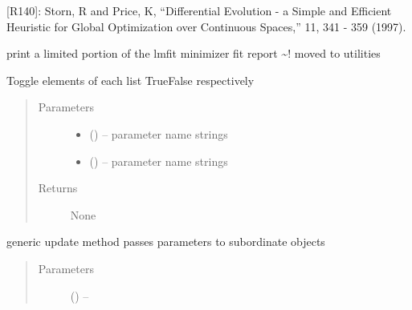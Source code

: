 \documentclass[letterpaper,10pt,english]{sphinxmanual}
\begin{document}
\begin{fulllineitems}
\begin{fulllineitems}
{[}R140{]}: Storn, R and Price, K, ``Differential Evolution - a Simple and Efficient Heuristic for Global                     Optimization over Continuous Spaces,''  11, 341 - 359 (1997).

\end{fulllineitems}


\begin{fulllineitems}
\label{\detokenize{rst/refinement:mstack.refinement.Refinement.filter_report}}
print a limited portion of the lmfit minimizer fit report
\textasciitilde{}! moved to utilities

\end{fulllineitems}


\begin{fulllineitems}
\label{\detokenize{rst/refinement:mstack.refinement.Refinement.flag}}
Toggle elements of each list True\textbar{}False respectively
\begin{quote}\begin{description}
\item[{Parameters}] \leavevmode\begin{itemize}
\item {} 
 () -- parameter name strings

\item {} 
 () -- parameter name strings

\end{itemize}

\item[{Returns}] \leavevmode
None

\end{description}\end{quote}

\end{fulllineitems}


\begin{fulllineitems}
\label{\detokenize{rst/refinement:mstack.refinement.Refinement.generic_update}}
generic update method passes parameters to subordinate objects
\begin{quote}\begin{description}
\item[{Parameters}] \leavevmode
{} () -- 


\end{description}
\end{quote}
\end{fulllineitems}
\end{fulllineitems}
\end{document}
